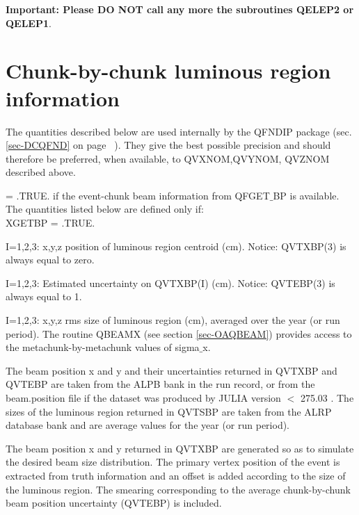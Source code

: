                     {\bf Important: Please DO NOT call any more the subroutines  QELEP2 or QELEP1}.
  


\par
\section{\label{sec-CHUNKINF}Chunk-by-chunk luminous region information}
\par
 The quantities described below are used internally by the QFNDIP package
  (sec. \ref{sec-DCQFND} on page ~\pageref{sec-DCQFND}). They give the best possible precision
 and  should therefore
 be preferred, when available, to  QVXNOM,QVYNOM,
QVZNOM described above.
\par
\begin{indentlist}{ 2.50cm}{ 2.75cm}
 
 = .TRUE. if the event-chunk beam information from QFGET$\_$BP
           is available.  The quantities listed below are defined only if:\\
            XGETBP = .TRUE.
 
  I=1,2,3: x,y,z position of luminous region centroid (cm).
           Notice: QVTXBP(3) is always equal to zero.
 
  I=1,2,3: Estimated uncertainty on QVTXBP(I) (cm).
           Notice: QVTEBP(3) is always equal to 1.
 
  I=1,2,3: x,y,z rms size of luminous region (cm), averaged
           over the year (or run period). The routine QBEAMX
           (see section \ref{sec-OAQBEAM}) provides access to the metachunk-by-metachunk
           values of sigma$\_$x.
 
The beam position x and y and their uncertainties returned in QVTXBP
and QVTEBP are taken from the ALPB bank in the run record, or from the
beam.position file if the dataset was produced by JULIA version $<$  275.03 .  The sizes of the luminous
region returned in QVTSBP are taken from the ALRP database bank and are
average values for the year (or run period).
 
The beam position x and y returned in QVTXBP are generated so as to
simulate the desired beam size distribution.  The primary vertex position
of the event is extracted from truth information and an offset is added
according to the size of the luminous region.  The smearing corresponding
to the average chunk-by-chunk beam position uncertainty (QVTEBP) is
included.
 

\end{indentlist}
